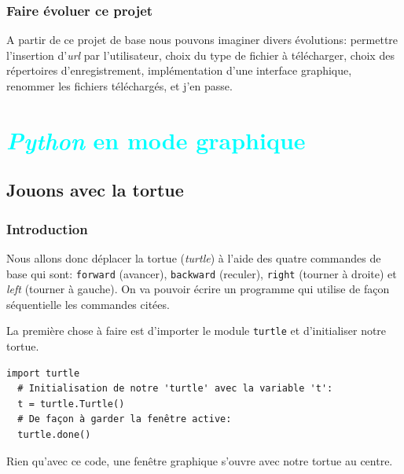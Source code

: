 \documentclass[a4paper,11pt]{book}
\begin{document}
\section{Faire évoluer ce projet}
A partir de ce projet de base nous pouvons imaginer divers évolutions: permettre l'insertion d'\textit{url} par l'utilisateur, choix du type de fichier à télécharger, choix des répertoires d'enregistrement, implémentation d'une interface graphique, renommer les fichiers téléchargés, et j'en passe.
\medskip

\part{\textcolor{cyan}{\textit{Python} en mode graphique}}
\chapter{Jouons avec la tortue}
\section{Introduction}
Nous allons donc déplacer la tortue (\textit{turtle}) à l'aide des quatre commandes de base qui sont: \texttt{forward} (avancer), \texttt{backward} (reculer), \texttt{right} (tourner à droite) et \textit{left} (tourner à gauche). On va pouvoir écrire un programme qui utilise de façon séquentielle les commandes citées.
\medskip

La première chose à faire est d'importer le module \texttt{turtle} et d'initialiser notre tortue.
\begin{lstlisting}[caption=Les trois lignes d'initialisation de notre fenêtre graphique]
  import turtle
  # Initialisation de notre 'turtle' avec la variable 't':
  t = turtle.Turtle()
  # De façon à garder la fenêtre active:
  turtle.done()
\end{lstlisting}
\medskip

Rien qu'avec ce code, une fenêtre graphique s'ouvre avec notre tortue au centre.
\medskip
\end{document}

